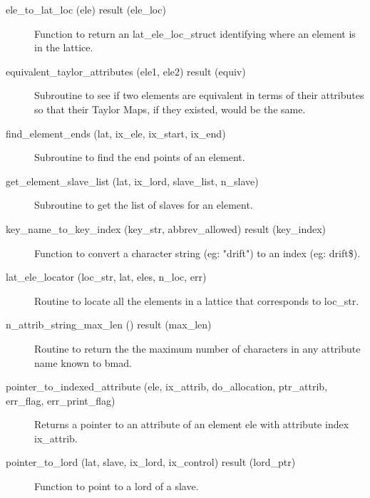 \begin{description}
\label{r:ele.to.lat.loc}
\item[ele_to_lat_loc (ele) result (ele_loc)] \Newline 
Function to return an lat_ele_loc_struct identifying where an element is in the lattice.

\item[equivalent_taylor_attributes (ele1, ele2) result (equiv)] \Newline 
Subroutine to see if two elements are equivalent in terms of their attributes so
that their Taylor Maps, if they existed, would be the same.

\label{r:find.element.ends}
\item[find_element_ends (lat, ix_ele, ix_start, ix_end)] \Newline
Subroutine to find the end points of an element. 

\label{r:get.element.slave.list}
\item[get_element_slave_list (lat, ix_lord, slave_list, n_slave)] \Newline 
Subroutine to get the list of slaves for an element.

\label{r:key.name.to.key.index}
\item[key_name_to_key_index (key_str, abbrev_allowed) result (key_index)] \Newline 
Function to convert a character string  (eg: "drift") to an index (eg: drift\$).

\label{r:lat.ele.locator}
\item[lat_ele_locator (loc_str, lat, eles, n_loc, err)] \Newline 
Routine to locate all the elements in a lattice that corresponds to loc_str. 

\label{r:n.attrib.string.max.len}
\item[n_attrib_string_max_len () result (max_len)] \Newline 
Routine to return the the maximum number of characters in any attribute
name known to bmad.

\label{r:pointer.to.indexed.attribute}
\item[pointer_to_indexed_attribute (ele, ix_attrib, do_allocation,
                                     ptr_attrib, err_flag, err_print_flag)] \Newline 
Returns a pointer to an attribute of an element ele with attribute index ix_attrib.

\label{r:pointer.to.lord}
\item[pointer_to_lord (lat, slave, ix_lord, ix_control) result (lord_ptr)] \Newline 
Function to point to a lord of a slave.


\end{description}
